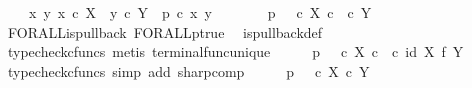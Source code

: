 \begin{isabellebody}
\ \ \ {\isachardoublequoteopen}{\isasymAnd}\ x\ y{\isachardot}{\kern0pt}\ x\ {\isasymin}\isactrlsub c\ X\ {\isasymLongrightarrow}\ y\ {\isasymin}\isactrlsub c\ Y\ {\isasymLongrightarrow}\ p\ {\isasymcirc}\isactrlsub c\ {\isasymlangle}x{\isacharcomma}{\kern0pt}\ y{\isasymrangle}\ {\isacharequal}{\kern0pt}\ {\isasymt}{\isachardoublequoteclose}\isanewline
%
\isadelimproof
%
\endisadelimproof
%
\isatagproof
{}\isamarkupfalse%
\ {\isacharminus}{\kern0pt}\isanewline
\ \ \isamarkupfalse%
\ {\isachardoublequoteopen}p\isactrlsup {\isasymsharp}\ {\isacharequal}{\kern0pt}\ {\isacharparenleft}{\kern0pt}{\isasymt}\ {\isasymcirc}\isactrlsub c\ {\isasymbeta}\isactrlbsub X\ {\isasymtimes}\isactrlsub c\ {\isasymone}\isactrlesub {\isacharparenright}{\kern0pt}\isactrlsup {\isasymsharp}\ {\isasymcirc}\isactrlsub c\ {\isasymbeta}\isactrlbsub Y\isactrlesub {\isachardoublequoteclose}\isanewline
\ \ \ \ \isamarkupfalse%
\ FORALL{\isacharunderscore}{\kern0pt}is{\isacharunderscore}{\kern0pt}pullback\ FORALL{\isacharunderscore}{\kern0pt}p{\isacharunderscore}{\kern0pt}true\ \isamarkupfalse%
\ is{\isacharunderscore}{\kern0pt}pullback{\isacharunderscore}{\kern0pt}def\ \isanewline
\ \ \ \ \isamarkupfalse%
\ {\isacharparenleft}{\kern0pt}typecheck{\isacharunderscore}{\kern0pt}cfuncs{\isacharcomma}{\kern0pt}\ metis\ terminal{\isacharunderscore}{\kern0pt}func{\isacharunderscore}{\kern0pt}unique{\isacharparenright}{\kern0pt}\isanewline
\ \ \isamarkupfalse%
\ \isamarkupfalse%
\ {\isachardoublequoteopen}p\isactrlsup {\isasymsharp}\ {\isacharequal}{\kern0pt}\ {\isacharparenleft}{\kern0pt}{\isacharparenleft}{\kern0pt}{\isasymt}\ {\isasymcirc}\isactrlsub c\ {\isasymbeta}\isactrlbsub X\ {\isasymtimes}\isactrlsub c\ {\isasymone}\isactrlesub {\isacharparenright}{\kern0pt}\ {\isasymcirc}\isactrlsub c\ {\isacharparenleft}{\kern0pt}id\ X\ {\isasymtimes}\isactrlsub f\ {\isasymbeta}\isactrlbsub Y\isactrlesub {\isacharparenright}{\kern0pt}{\isacharparenright}{\kern0pt}\isactrlsup {\isasymsharp}{\isachardoublequoteclose}\isanewline
\ \ \ \ \isamarkupfalse%
\ {\isacharparenleft}{\kern0pt}typecheck{\isacharunderscore}{\kern0pt}cfuncs{\isacharcomma}{\kern0pt}\ simp\ add{\isacharcolon}{\kern0pt}\ sharp{\isacharunderscore}{\kern0pt}comp{\isacharparenright}{\kern0pt}\isanewline
\ \ \isamarkupfalse%
\ \isamarkupfalse%
\ {\isachardoublequoteopen}p\isactrlsup {\isasymsharp}\ {\isacharequal}{\kern0pt}\ {\isacharparenleft}{\kern0pt}{\isasymt}\ {\isasymcirc}\isactrlsub c\ {\isasymbeta}\isactrlbsub X\ {\isasymtimes}\isactrlsub c\ Y\isactrlesub {\isacharparenright}{\kern0pt}\isactrlsup {\isasymsharp}{\isachardoublequoteclose}\isanewline

\end{isabellebody}
